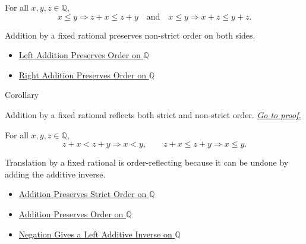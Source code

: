 \begin{remark*}
For all $x,y,z\in\mathbb{Q}$,
\[
x\le y\Longrightarrow z+x\le z+y
\quad\text{and}\quad
x\le y\Longrightarrow x+z\le y+z.
\]
\end{remark*}

\begin{remark*}[Interpretation]
Addition by a fixed rational preserves non-strict order on both sides.
\end{remark*}

\begin{dependencies}
\begin{itemize}
  \item \hyperref[thm:left-addition-preserves-order-on-q]{Left Addition Preserves Order on $\mathbb{Q}$}
  \item \hyperref[cor:right-addition-preserves-order-on-q]{Right Addition Preserves Order on $\mathbb{Q}$}
\end{itemize}
\end{dependencies}

\begin{corollarybox}{Corollary}
\begin{corollary}
\label{cor:addition-reflects-order-on-q}
Addition by a fixed rational reflects
 both strict and non-strict order.
\hyperref[prf:addition-reflects-order-on-q]{\textit{Go to proof.}}
\end{corollary}
\end{corollarybox}

\begin{remark*}
For all $x,y,z\in\mathbb{Q}$,
\[
z+x<z+y\Longrightarrow x<y,
\qquad
z+x\le z+y\Longrightarrow x\le y.
\]
\end{remark*}

\begin{remark*}[Interpretation]
Translation by a fixed rational is order-reflecting because it can be undone
by adding the additive inverse.
\end{remark*}

\begin{dependencies}
\begin{itemize}
  \item \hyperref[thm:addition-preserves-strict-order-on-q]{Addition Preserves Strict Order on $\mathbb{Q}$}
  \item \hyperref[thm:addition-preserves-order-on-q]{Addition Preserves Order on $\mathbb{Q}$}
  \item \hyperref[thm:negation-left-additive-inverse-on-q]{Negation Gives a Left Additive Inverse on $\mathbb{Q}$}
\end{itemize}
\end{dependencies}

